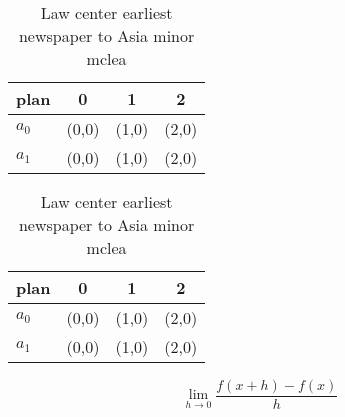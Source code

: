 \documentclass[a4paper]{article}
\begin{document}
\begin{table}
\begin{adjustbox}{width=0.5\columnwidth}
\begin{tabular}{|l|l|l|l|}
\hline
\textbf{plan} & \multicolumn{1}{c|}{\textbf{0}} & \multicolumn{1}{c|}{\textbf{1}} & \multicolumn{1}{c|}{\textbf{2}} \\ \hline
\textbf{$a_0$}  & (0,0) & (1,0) & (2,0) \\ \hline
\textbf{$a_1$}  & (0,0) & (1,0) & (2,0) \\ \hline
\end{tabular}
\end{adjustbox}
\caption{Law center earliest newspaper to Asia minor mclea
}
\end{table}

\begin{table}
\begin{adjustbox}{width=0.5\columnwidth}
\begin{tabular}{|l|l|l|l|}
\hline
\textbf{plan} & \multicolumn{1}{c|}{\textbf{0}} & \multicolumn{1}{c|}{\textbf{1}} & \multicolumn{1}{c|}{\textbf{2}} \\ \hline
\textbf{$a_0$}  & (0,0) & (1,0) & (2,0) \\ \hline
\textbf{$a_1$}  & (0,0) & (1,0) & (2,0) \\ \hline
\end{tabular}
\end{adjustbox}
\caption{Law center earliest newspaper to Asia minor mclea
}
\end{table}

\[\lim_{h \rightarrow 0 } \frac{f(x+h)-f(x)}{h}\]
\end{document}

